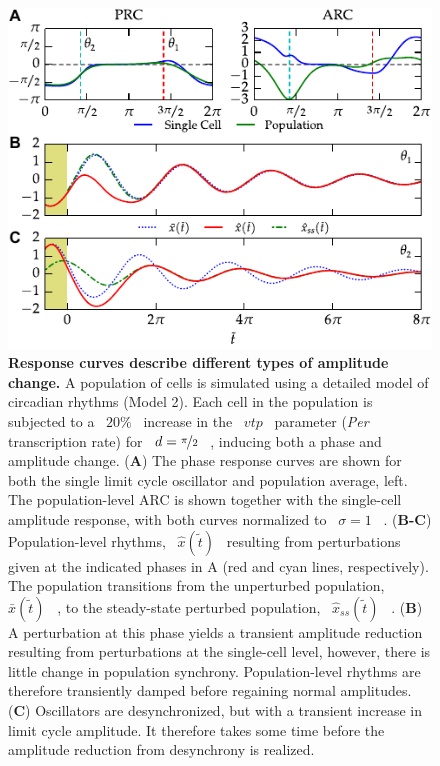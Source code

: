 \documentclass[11pt, letterpaper]{article}
\providecommand{\DIFadd}[1]{{\protect\color{blue}#1}} %
\providecommand{\DIFaddend}{} %
\providecommand{\DIFaddFL}[1]{\DIFadd{#1}} %
\begin{document}
\begin{figure}[tbp]
  \begin{center}
    \includegraphics[width=.75\textwidth]{figures/figure_4.pdf}
    \caption{\DIFaddFL{
{}\bfseries \DIFaddFL{Response curves describe different types of amplitude change.}}
\DIFaddFL{A population of cells is simulated using a detailed model of circadian rhythms (Model 2).
Each cell in the population is subjected to a \mbox{%
$20\%$
}%
increase in the \mbox{%
$\mathit{vtp}$
}%
parameter (}{\itshape \DIFaddFL{Per}} \DIFaddFL{transcription rate) for \mbox{%
$d=\nicefrac{\pi}{2}$
}%
, inducing both a phase and amplitude change.
(}{\bfseries \DIFaddFL{A}}\DIFaddFL{) The phase response curves are shown for both the single limit cycle oscillator and population average, left.
The population-level ARC is shown together with the single-cell amplitude response, with both curves normalized to \mbox{%
$\sigma=1$
}%
.
(}{\bfseries \DIFaddFL{B-C}}\DIFaddFL{) Population-level rhythms, \mbox{%
$\hat{x}(\tilde{t})$
}%
resulting from perturbations given at the indicated phases in A (red and cyan lines, respectively).
The population transitions from the unperturbed population, \mbox{%
$\bar{x}(\tilde{t})$
}%
, to the steady-state perturbed population, \mbox{%
$\hat{x}_{ss}(\tilde{t})$
}%
.
(}{\bfseries \DIFaddFL{B}}\DIFaddFL{) A perturbation at this phase yields a transient amplitude reduction resulting from perturbations at the single-cell level, however, there is little change in population synchrony.
Population-level rhythms are therefore transiently damped before regaining normal amplitudes.
(}{\bfseries \DIFaddFL{C}}\DIFaddFL{) Oscillators are desynchronized, but with a transient increase in limit cycle amplitude.
It therefore takes some time before the amplitude reduction from desynchrony is realized.}}
  \end{center}
\end{figure}
\DIFaddend 
\end{document}
